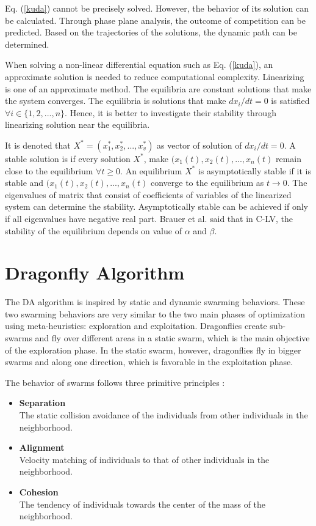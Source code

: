 Eq. (\ref{kuda}) cannot be precisely solved. However, the behavior of its solution can be calculated. Through phase plane analysis, the outcome of competition can be predicted. Based on the trajectories of the solutions, the dynamic path can be determined. 

When solving a non-linear differential equation such as Eq. (\ref{kuda}), an approximate solution is needed to reduce computational complexity. Linearizing is one of an approximate method.    The equilibria are constant solutions that make the system converges. The equilibria is solutions that make $dx_i/dt = 0$ is satisfied $\forall i \in \{1,2,...,n\}$. Hence, it is better to investigate their stability through linearizing solution near the equilibria. 

It is denoted that $X^* = (x_1^*, x_2^*,..., x_v^*)$ as vector of solution of $dx_i/dt = 0$. A stable solution is if every solution $X^*$, make $(x_1(t), x_2(t), ..., x_n(t)$ remain close to the equilibrium $\forall t \geq 0$. An equilibrium $X^*$ is asymptotically stable if it is stable and $(x_1(t), x_2(t), ..., x_n(t)$ converge to the equilibrium as $t \rightarrow 0$. The eigenvalues of matrix that consist of coefficients of variables of the linearized system can determine the stability. Asymptotically stable can be achieved  if only if all eigenvalues have negative real part. Brauer et al. \cite{bukukodok} said that in C-LV, the stability of the equilibrium depends on value of $\alpha$ and $\beta$.





\section{Dragonfly Algorithm}

The DA algorithm is inspired by static and dynamic swarming behaviors. These two swarming behaviors are very similar to the two main phases of optimization using meta-heuristics: exploration and exploitation. Dragonflies create sub-swarms and fly over different areas in a static swarm, which is the main objective of the exploration phase. In the static swarm, however, dragonflies fly in bigger swarms and along one direction, which is favorable in the exploitation phase.

The behavior of swarms follows three primitive principles \cite{Mirjalili2016}: 

\begin{itemize}
	\item \textbf{Separation}\\ The static collision avoidance of the individuals from other individuals in the neighborhood.
	\item \textbf{Alignment}\\ Velocity matching of individuals to that of other individuals in the neighborhood.
	\item \textbf{Cohesion}\\ The tendency of individuals towards the center of the mass of the neighborhood.
\end{itemize}

